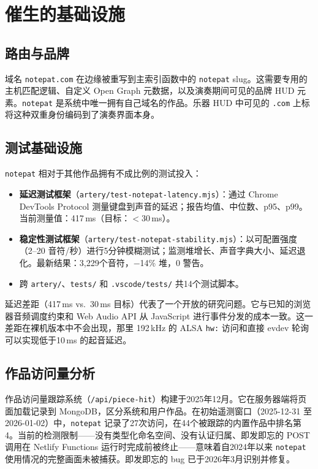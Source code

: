 \documentclass[10pt,letterpaper,twocolumn]{article}
\begin{document}
\section{催生的基础设施}

\subsection{路由与品牌}

域名 \texttt{notepat.com} 在边缘被重写到主索引函数中的 \texttt{notepat} slug。这需要专用的主机匹配逻辑、自定义 Open Graph 元数据，以及演奏期间可见的品牌 HUD 元素。\texttt{notepat} 是系统中唯一拥有自己域名的作品。乐器 HUD 中可见的 \texttt{.com} 上标将这种双重身份编码到了演奏界面本身。

\subsection{测试基础设施}

\texttt{notepat} 相对于其他作品拥有不成比例的测试投入：

\begin{itemize}
  \item \textbf{延迟测试框架}（\texttt{artery/test-notepat-latency.mjs}）：通过 Chrome DevTools Protocol 测量键盘到声音的延迟；报告均值、中位数、p95、p99。当前测量值：417\,ms（目标：$<$30\,ms）。
  \item \textbf{稳定性测试框架}（\texttt{artery/test-notepat-stability.mjs}）：以可配置强度（2--20 音符/秒）进行5分钟模糊测试；监测堆增长、声音字典大小、延迟退化。最新结果：3,229个音符，$-$14\% 堆，0 警告。
  \item 跨 \texttt{artery/}、\texttt{tests/} 和 \texttt{.vscode/tests/} 共14个测试脚本。
\end{itemize}

延迟差距（417\,ms vs.\ 30\,ms 目标）代表了一个开放的研究问题。它与已知的浏览器音频调度约束和 Web Audio API 从 JavaScript 进行事件分发的成本一致。这一差距在裸机版本中不会出现，那里 192\,kHz 的 ALSA \texttt{hw:} 访问和直接 evdev 轮询可以实现低于10\,ms 的起音延迟。

\subsection{作品访问量分析}

作品访问量跟踪系统（\texttt{/api/piece-hit}）构建于2025年12月。它在服务器端将页面加载记录到 MongoDB，区分系统和用户作品。在初始遥测窗口（2025-12-31 至 2026-01-02）中，\texttt{notepat} 记录了27次访问，在44个被跟踪的内置作品中排名第4。当前的检测限制——没有类型化命名空间、没有认证归属、即发即忘的 POST 调用在 Netlify Functions 运行时完成前被终止——意味着自2024年以来 \texttt{notepat} 使用情况的完整画面未被捕获。即发即忘的 bug 已于2026年3月识别并修复。
\end{document}
